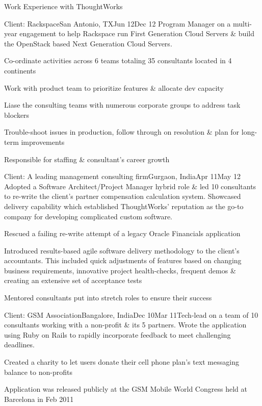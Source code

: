 \documentclass{resume} %
\begin{document}
\begin{rSection}{Work Experience with ThoughtWorks}

\begin{rSubsection}{Client: Rackspace}{San Antonio, TX}{Jun
    12}{Dec 12}
{Program Manager on a multi-year engagement to help Rackspace run
  First Generation Cloud Servers \& build the OpenStack based Next
  Generation Cloud Servers.}

\item Co-ordinate activities across 6 teams
  totaling 35 consultants located in 4 continents
\item Work with product team to prioritize features \& allocate dev capacity
\item Liase the consulting teams with numerous corporate groups to address task blockers
\item Trouble-shoot issues in production, follow
  through on resolution \& plan for long-term improvements
\item Responsible for staffing \& consultant's career growth
\end{rSubsection}


\begin{rSubsection}{Client: A leading management consulting
    firm}{Gurgaon, India}{Apr 11}{May 12}
{Adopted a Software Architect/Project Manager hybrid role \& led 10 consultants to re-write the
  client's partner compensation calculation system. Showcased delivery
  capability which established ThoughtWorks' reputation as the go-to company for developing complicated custom software.}

\item Rescued a failing re-write attempt of a legacy Oracle Financials
  application
\item Introduced results-based agile software delivery
  methodology to the client's accountants. This included quick
  adjustments of features based on changing business requirements, innovative
  project health-checks, frequent demos \& creating an extensive set
  of acceptance tests
\item Mentored consultants put into stretch roles to ensure their
  success
\end{rSubsection}


\begin{rSubsection}{Client: GSM Association}{Bangalore, India}{Dec 10}{Mar 11}{Tech-lead on a team of 10 consultants working with a non-profit
  \& its 5 partners. Wrote the application using Ruby on Rails to
  rapidly incorporate feedback to meet challenging deadlines.}
\item Created a charity to let users donate their cell phone plan's text messaging
  balance to non-profits
\item Application was released publicly at the GSM Mobile World Congress held at Barcelona in Feb 2011
\end{rSubsection}



\end{rSection}
\end{document}
